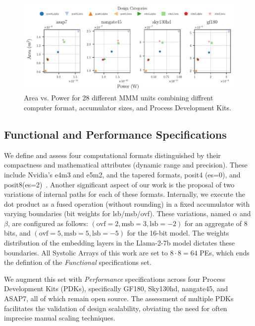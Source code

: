 \begin{figure}[b]
\centering
	\vspace{-0.5cm}
	\includegraphics[width=0.9\columnwidth]{./figures/power_vs_area_comparison.pdf}
	\vspace{-0.2cm}
	\caption{Area vs. Power for 28 different MMM units combining diffrent computer format, accumulator sizes, and Process Development Kits.}
	\label{fig:power_vs_area}
\end{figure}

\subsection{Functional and Performance Specifications}
\label{sec:specifications}
We define and assess four computational formats distinguished by their compactness and mathematical attributes (dynamic range and precision).
These include Nvidia's e4m3 and e5m2, and the tapered formats, posit4 (es=0), and posit8(es=2)~\cite{micikevicius_fp8_2022,gustafson_beating_2017}.
Another significant aspect of our work is the proposal of two variations of internal paths for each of these formats.
Internally, we execute the dot product as a fused operation (without rounding) in a fixed accumulator with varying boundaries (bit weights for lsb/msb/ovf).
These variations, named $\alpha$ and $\beta$, are configured as follows: $(\text{ovf}=2,\text{msb}=3,\text{lsb}=-2)$ for an aggregate of 8 bits, and $(\text{ovf}=5,\text{msb}=5,\text{lsb}=-5)$ for the 16-bit model.
The weights distribution of the embedding layers in the Llama-2-7b model dictates these boundaries.
All Systolic Arrays of this work are set to $8 \cdot 8=64$ PEs, which ends the defintion of the \textit{Functional} specifications set.

We augment this set with \textit{Performance} specifications across four Process Development Kits (PDKs), specifically GF180, Sky130hd, nangate45, and ASAP7, all of which remain open source.
The assessment of multiple PDKs facilitates the validation of design scalability, obviating the need for often imprecise manual scaling techniques.

